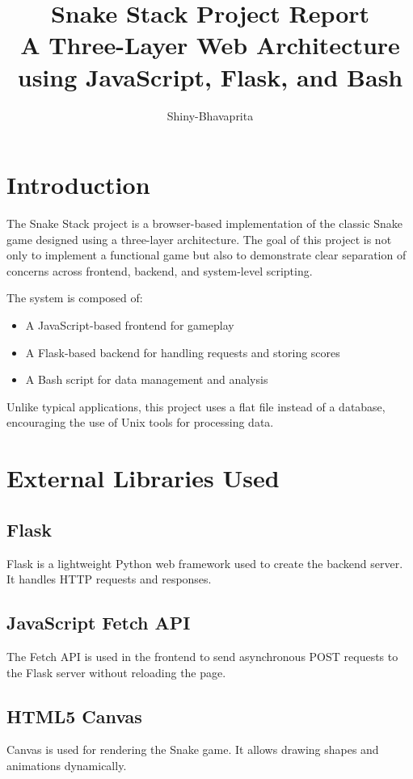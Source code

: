 \documentclass[12pt]{article}
\title{\textbf{Snake Stack Project Report}\\
A Three-Layer Web Architecture using JavaScript, Flask, and Bash}
\author{Shiny-Bhavaprita}
\date{}
\begin{document}
\maketitle

\newpage
\tableofcontents
\newpage

\section{Introduction}

The Snake Stack project is a browser-based implementation of the classic Snake game designed using a three-layer architecture. The goal of this project is not only to implement a functional game but also to demonstrate clear separation of concerns across frontend, backend, and system-level scripting.

The system is composed of:
\begin{itemize}
    \item A JavaScript-based frontend for gameplay
    \item A Flask-based backend for handling requests and storing scores
    \item A Bash script for data management and analysis
\end{itemize}

Unlike typical applications, this project uses a flat file instead of a database, encouraging the use of Unix tools for processing data.

\section{External Libraries Used}

\subsection{Flask}
Flask is a lightweight Python web framework used to create the backend server. It handles HTTP requests and responses.

\subsection{JavaScript Fetch API}
The Fetch API is used in the frontend to send asynchronous POST requests to the Flask server without reloading the page.

\subsection{HTML5 Canvas}
Canvas is used for rendering the Snake game. It allows drawing shapes and animations dynamically.
\end{document}
